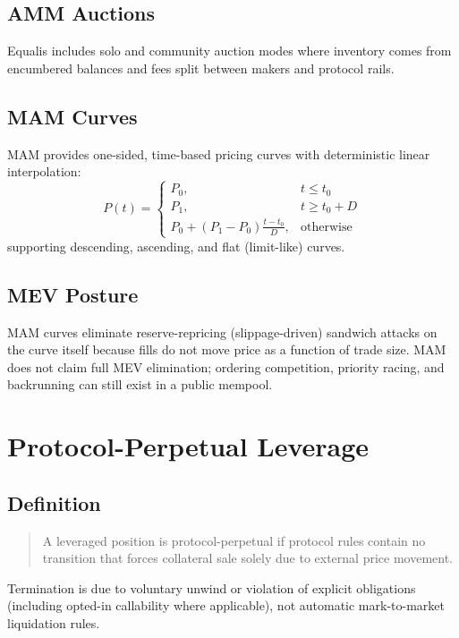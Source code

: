 \documentclass[version=preprint]{iacrcc}
\begin{document}
\subsection{AMM Auctions}

Equalis includes solo and community auction modes where inventory comes from encumbered balances and fees split between makers and protocol rails.

\subsection{MAM Curves}

MAM provides one-sided, time-based pricing curves with deterministic linear interpolation:
\[
P(t)=
\begin{cases}
P_0, & t \le t_0 \\
P_1, & t \ge t_0 + D \\
P_0 + (P_1-P_0)\frac{t-t_0}{D}, & \text{otherwise}
\end{cases}
\]
supporting descending, ascending, and flat (limit-like) curves.

\subsection{MEV Posture}

MAM curves eliminate reserve-repricing (slippage-driven) sandwich attacks on the curve itself because fills do not move price as a function of trade size. MAM does not claim full MEV elimination; ordering competition, priority racing, and backrunning can still exist in a public mempool.

\section{Protocol-Perpetual Leverage}

\subsection{Definition}

\begin{quote}
A leveraged position is protocol-perpetual if protocol rules contain no transition that forces collateral sale solely due to external price movement.
\end{quote}

Termination is due to voluntary unwind or violation of explicit obligations (including opted-in callability where applicable), not automatic mark-to-market liquidation rules.
\end{document}
